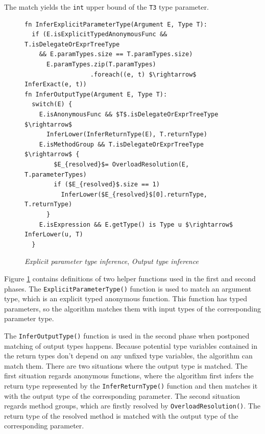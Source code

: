 The match yields the \texttt{int} upper bound of the \texttt{T3} type parameter.
\begin{figure}[h!]
\begin{lstlisting}[style=myAlgo, mathescape=true]
fn InferExplicitParameterType(Argument E, Type T):
  if (E.isExplicitTypedAnonymousFunc && T.isDelegateOrExprTreeType
    && E.paramTypes.size == T.paramTypes.size)
      E.paramTypes.zip(T.paramTypes)
                  .foreach((e, t) $\rightarrow$ InferExact(e, t))
fn InferOutputType(Argument E, Type T):
  switch(E) {
	E.isAnonymousFunc && $T$.isDelegateOrExprTreeType $\rightarrow$
	  InferLower(InferReturnType(E), T.returnType) 
	E.isMethodGroup && T.isDelegateOrExprTreeType $\rightarrow$ {
	  	$E_{resolved}$= OverloadResolution(E, T.parameterTypes)
	  	if ($E_{resolved}$.size == 1) 
	  	  InferLower($E_{resolved}$[0].returnType, T.returnType) 
	  }
	E.isExpression && E.getType() is Type u $\rightarrow$ InferLower(u, T)
  }
\end{lstlisting}
\caption{\textit{Explicit parameter type inference}, \textit{Output type inference}}
\label{img11:methodTypeInference2}
\end{figure}
\par
Figure \ref{img11:methodTypeInference2} contains definitions of two helper functions used in the first and second phases. 
The \texttt{ExplicitParameterType()} function is used to match an argument type, which is an explicit typed anonymous function. 
This function has typed parameters, so the algorithm matches them with input types of the corresponding parameter type.
\par
The \texttt{InferOutputType()} function is used in the second phase when postponed
matching of output types happens. 
Because potential type variables contained in the return types don’t depend on any unfixed type variables, the algorithm can match them. 
There are two situations where the output type is matched. 
The first situation regards anonymous functions, where the algorithm first infers the return type represented by the \texttt{InferReturnType()} function and then matches it with the output type of the corresponding parameter. 
The second situation regards method groups, which are firstly resolved by \texttt{OverloadResolution()}. 
The return type of the resolved method is matched with the output type of the corresponding parameter.
\par
